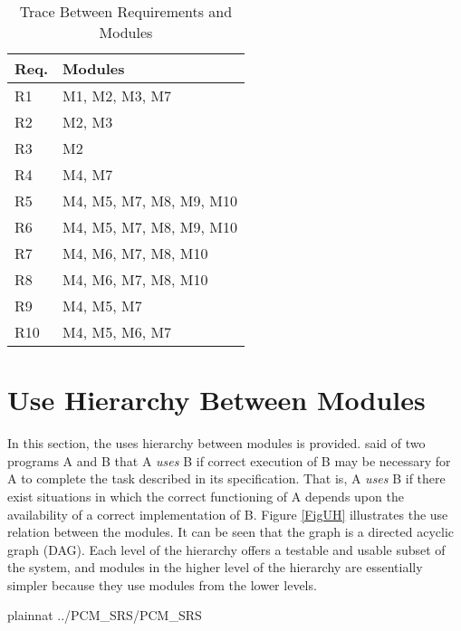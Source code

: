 \documentclass[12pt]{article}
\begin{document}
\begin{table}[H]
\centering
\begin{tabular}{p{} p{}}
\toprule
\textbf{Req.} & \textbf{Modules}\\
\midrule
R1 & M1, M2, M3, M7\\
R2 & M2, M3\\
R3 & M2\\
R4 & M4, M7\\
R5 & M4, M5, M7, M8, M9, M10\\
R6 & M4, M5, M7, M8, M9, M10\\
R7 & M4, M6, M7, M8, M10\\
R8 & M4, M6, M7, M8, M10\\
R9 & M4, M5, M7\\
R10 & M4, M5, M6, M7\\
\bottomrule
\end{tabular}
\caption{Trace Between Requirements and Modules}
\label{TblRT}
\end{table}


\section{Use Hierarchy Between Modules} \label{SecUse}

In this section, the uses hierarchy between modules is
provided. \citet{Parnas1978} said of two programs A and B that A {\em uses} B if
correct execution of B may be necessary for A to complete the task described in
its specification. That is, A {\em uses} B if there exist situations in which
the correct functioning of A depends upon the availability of a correct
implementation of B.  Figure \ref{FigUH} illustrates the use relation between
the modules. It can be seen that the graph is a directed acyclic graph
(DAG). Each level of the hierarchy offers a testable and usable subset of the
system, and modules in the higher level of the hierarchy are essentially simpler
because they use modules from the lower levels.




 {plainnat}
 {../PCM_SRS/PCM_SRS}
\end{document}
